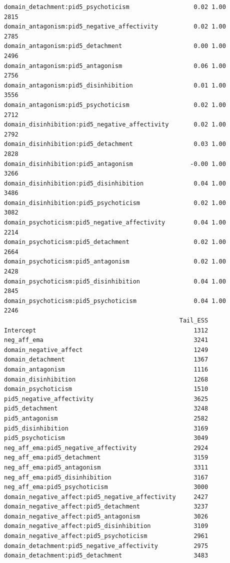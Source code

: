 \documentclass[
  11pt,
  a4paper,
  onecolumn]{article}
\begin{document}
\begin{verbatim}
domain_detachment:pid5_psychoticism                  0.02 1.00     2815
domain_antagonism:pid5_negative_affectivity          0.02 1.00     2785
domain_antagonism:pid5_detachment                    0.00 1.00     2496
domain_antagonism:pid5_antagonism                    0.06 1.00     2756
domain_antagonism:pid5_disinhibition                 0.01 1.00     3556
domain_antagonism:pid5_psychoticism                  0.02 1.00     2712
domain_disinhibition:pid5_negative_affectivity       0.02 1.00     2792
domain_disinhibition:pid5_detachment                 0.03 1.00     2828
domain_disinhibition:pid5_antagonism                -0.00 1.00     3266
domain_disinhibition:pid5_disinhibition              0.04 1.00     3486
domain_disinhibition:pid5_psychoticism               0.02 1.00     3082
domain_psychoticism:pid5_negative_affectivity        0.04 1.00     2214
domain_psychoticism:pid5_detachment                  0.02 1.00     2664
domain_psychoticism:pid5_antagonism                  0.02 1.00     2428
domain_psychoticism:pid5_disinhibition               0.04 1.00     2845
domain_psychoticism:pid5_psychoticism                0.04 1.00     2246
                                                 Tail_ESS
Intercept                                            1312
neg_aff_ema                                          3241
domain_negative_affect                               1249
domain_detachment                                    1367
domain_antagonism                                    1116
domain_disinhibition                                 1268
domain_psychoticism                                  1510
pid5_negative_affectivity                            3625
pid5_detachment                                      3248
pid5_antagonism                                      2582
pid5_disinhibition                                   3169
pid5_psychoticism                                    3049
neg_aff_ema:pid5_negative_affectivity                2924
neg_aff_ema:pid5_detachment                          3159
neg_aff_ema:pid5_antagonism                          3311
neg_aff_ema:pid5_disinhibition                       3167
neg_aff_ema:pid5_psychoticism                        3000
domain_negative_affect:pid5_negative_affectivity     2427
domain_negative_affect:pid5_detachment               3237
domain_negative_affect:pid5_antagonism               3026
domain_negative_affect:pid5_disinhibition            3109
domain_negative_affect:pid5_psychoticism             2961
domain_detachment:pid5_negative_affectivity          2975
domain_detachment:pid5_detachment                    3483

\end{verbatim}
\end{document}
